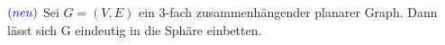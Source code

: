 \documentclass[12pt,titlepage]{article}
\begin{document}
\begin{satz}$\textcolor{blue}{(neu)}$
Sei $G=(V,E)$ ein 3-fach zusammenhängender planarer Graph. Dann lässt sich G eindeutig in die Sphäre einbetten.
\end{satz}
\begin{comment}

\begin{definition}
Sei $(X,<)$ eine simpliziale Fläche und $F\in X_2$ eine Fläche in $X$. Dann definieren man die Menge aller benachbarten  Flächen von $F$ in $X$ als 
\[
N_X(F):=\{F' \in X_2 \mid \exists f\in X_1 :f<F,f<F'\}
\]
und $N(X):=\bigcup_{F \in X_2} N(F)$
\end{definition}
\begin{definition}$\textcolor{red}{(new)}$
Sei $(X,<)$ eine simpliziale Fläche und $M\subset X_2$ eine Teilmenge der Flächen von $X$.
 Man identifiziert $M$ mit der simplizialen Fläche $(M^X,\prec)$, die durch die Knotenmenge $M^X_1:=\{V\in X_0 \mid X_2(V)\subseteq M\}$, die Kantenmenge $M^X_1:=\{e\in X_1 \mid X_2(V)\subseteq M\}$ und die Flächenmenge $M^X_2:=M$ gegeben ist.
 Für $x,y\in M^X$ gilt $x\prec y$ in $M^X$, falls $x<y$ in $X$ gilt.
\end{definition}
\begin{definition}
Sei $(X,<)$ eine simpliziale Fläche. Man nennt eine Menge $\emptyset \subsetneq M \subseteq X_2$ \emph{einfach zusammenhängend}, falls $M=X_2$ gilt oder $M\subset X_2$ und die mit den Mengen $M$ und $X_2\setminus M$ identifizierten simplizialen Flächen zusammenhängend sind.
\end{definition}
\begin{bemerkung}
Für jede simpliziale Fläche $(X,<)$ lassen sich  einfach zusammenhängende Teilmengen finden, denn nach Definition ist $X_2$ einfach zusammenhängend und offensichtlich ist $\{F\}$ für ein $F\in X_2$ einfach zusammenhängend. Falls es zu $F$ eine adjazente Fläche $F'\in X_2$ gibt, so bildet ebenfalls $\{F,F'\}$ eine einfach zusammenhängende Menge von $X$.
\end{bemerkung}
\begin{lemma}%
Sei $(X,<)$ eine geschlossene simpliziale Fläche mit $\chi (X)=2$ ohne 2- und 3-Waists. Sei weiterhin $M\subset X_2$ einfach zusammenhängend. Dann existiert eine Fläche $F\in X_2 \setminus M$, sodass $M \cup \{F\}$ wieder einfach zusammenhängend ist.
\end{lemma}
\begin{proof}
$textcolor{red}{nicht zielfuhrend}$

\end{comment}
\end{document}
